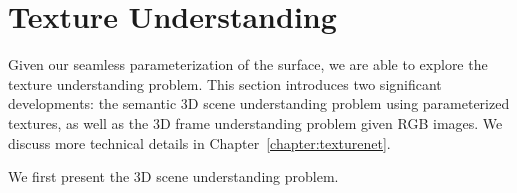 \section{Texture Understanding}
\label{intro:understand}

Given our seamless parameterization of the surface, we are able to explore the texture understanding problem. This section introduces two significant developments: the semantic 3D scene understanding problem using parameterized textures, as well as the 3D frame understanding problem given  RGB images. We discuss more technical details in Chapter~\ref{chapter:texturenet}.

\vspace*{10pt}\noindent We first present the 3D scene understanding problem.


